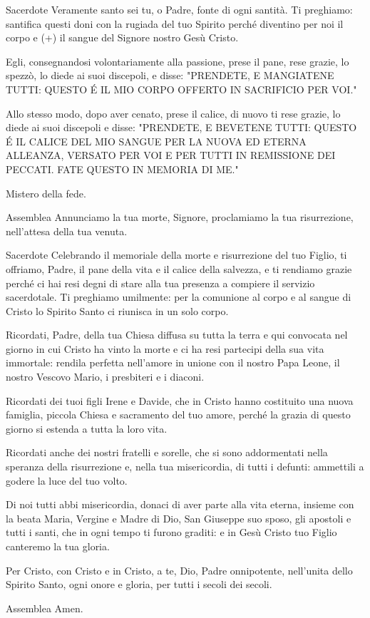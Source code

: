 \begin{dialoghi}
\item[Sacerdote] Veramente santo sei tu, o Padre, fonte di ogni santità. Ti preghiamo: santifica questi doni con la rugiada del tuo Spirito perché diventino per noi il corpo e (+) il sangue del Signore nostro Gesù Cristo.

Egli, consegnandosi volontariamente alla passione, prese il pane, rese grazie, lo spezzò, lo diede ai suoi discepoli, e disse: "PRENDETE, E MANGIATENE TUTTI: QUESTO É IL MIO CORPO OFFERTO IN SACRIFICIO PER VOI."

Allo stesso modo, dopo aver cenato, prese il calice, di nuovo ti rese grazie, lo diede ai suoi discepoli e disse: "PRENDETE, E BEVETENE TUTTI: QUESTO É IL CALICE DEL MIO SANGUE PER LA NUOVA ED ETERNA ALLEANZA, VERSATO PER VOI E PER TUTTI IN REMISSIONE DEI PECCATI. FATE QUESTO IN MEMORIA DI ME."

Mistero della fede.
\item[Assemblea] Annunciamo la tua morte, Signore, proclamiamo la tua risurrezione, nell'attesa della tua venuta.
\item[Sacerdote] Celebrando il memoriale della morte e risurrezione del tuo Figlio, ti offriamo, Padre, il pane della vita e il calice della salvezza, e ti rendiamo grazie perché ci hai resi degni di stare alla tua presenza a compiere il servizio sacerdotale. Ti preghiamo umilmente: per la comunione al corpo e al sangue di Cristo lo Spirito Santo ci riunisca in un solo corpo.

Ricordati, Padre, della tua Chiesa diffusa su tutta la terra e qui convocata nel giorno in cui Cristo ha vinto la morte e ci ha resi partecipi della sua vita immortale: rendila perfetta nell'amore in unione con il nostro Papa Leone, il nostro Vescovo Mario, i presbiteri e i diaconi.

Ricordati dei tuoi figli Irene e Davide, che in Cristo hanno costituito una nuova famiglia, piccola Chiesa e sacramento del tuo amore, perché la grazia di questo giorno si estenda a tutta la loro vita.

Ricordati anche dei nostri fratelli e sorelle, che si sono addormentati nella speranza della risurrezione e, nella tua misericordia, di tutti i defunti: ammettili a godere la luce del tuo volto.

Di noi tutti abbi misericordia, donaci di aver parte alla vita eterna, insieme con la beata Maria, Vergine e Madre di Dio, San Giuseppe suo sposo, gli apostoli e tutti i santi, che in ogni tempo ti furono graditi: e in Gesù Cristo tuo Figlio canteremo la tua gloria.

Per Cristo, con Cristo e in Cristo, a te, Dio, Padre onnipotente, nell'unita dello Spirito Santo, ogni onore e gloria, per tutti i secoli dei secoli.
\item[Assemblea] Amen.
\end{dialoghi}